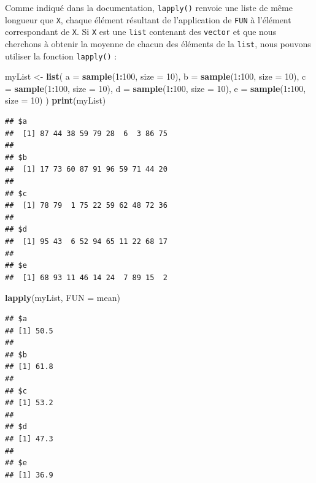 \documentclass[]{book}
\newenvironment{Shaded}{\begin{snugshade}}{\end{snugshade}}
\newcommand{\DataTypeTok}[1]{\textcolor[rgb]{0.13,0.29,0.53}{#1}}
\newcommand{\DecValTok}[1]{\textcolor[rgb]{0.00,0.00,0.81}{#1}}
\newcommand{\KeywordTok}[1]{\textcolor[rgb]{0.13,0.29,0.53}{\textbf{#1}}}
\newcommand{\NormalTok}[1]{#1}
\newcommand{\OperatorTok}[1]{\textcolor[rgb]{0.81,0.36,0.00}{\textbf{#1}}}
\newcommand{\StringTok}[1]{\textcolor[rgb]{0.31,0.60,0.02}{#1}}
\begin{document}
Comme indiqué dans la documentation, \texttt{lapply()} renvoie une liste de même longueur que \texttt{X}, chaque élément résultant de l'application de \texttt{FUN} à l'élément correspondant de \texttt{X}. Si \texttt{X} est une \texttt{list} contenant des \texttt{vector} et que nous cherchons à obtenir la moyenne de chacun des éléments de la \texttt{list}, nous pouvons utiliser la fonction \texttt{lapply()} :

\begin{Shaded}
\begin{Highlighting}[]
\NormalTok{myList <-}\StringTok{ }\KeywordTok{list}\NormalTok{(}
  \DataTypeTok{a =} \KeywordTok{sample}\NormalTok{(}\DecValTok{1}\OperatorTok{:}\DecValTok{100}\NormalTok{, }\DataTypeTok{size =} \DecValTok{10}\NormalTok{), }
  \DataTypeTok{b =} \KeywordTok{sample}\NormalTok{(}\DecValTok{1}\OperatorTok{:}\DecValTok{100}\NormalTok{, }\DataTypeTok{size =} \DecValTok{10}\NormalTok{), }
  \DataTypeTok{c =} \KeywordTok{sample}\NormalTok{(}\DecValTok{1}\OperatorTok{:}\DecValTok{100}\NormalTok{, }\DataTypeTok{size =} \DecValTok{10}\NormalTok{), }
  \DataTypeTok{d =} \KeywordTok{sample}\NormalTok{(}\DecValTok{1}\OperatorTok{:}\DecValTok{100}\NormalTok{, }\DataTypeTok{size =} \DecValTok{10}\NormalTok{), }
  \DataTypeTok{e =} \KeywordTok{sample}\NormalTok{(}\DecValTok{1}\OperatorTok{:}\DecValTok{100}\NormalTok{, }\DataTypeTok{size =} \DecValTok{10}\NormalTok{)}
\NormalTok{)}
\KeywordTok{print}\NormalTok{(myList)}
\end{Highlighting}
\end{Shaded}

\begin{verbatim}
## $a
##  [1] 87 44 38 59 79 28  6  3 86 75
## 
## $b
##  [1] 17 73 60 87 91 96 59 71 44 20
## 
## $c
##  [1] 78 79  1 75 22 59 62 48 72 36
## 
## $d
##  [1] 95 43  6 52 94 65 11 22 68 17
## 
## $e
##  [1] 68 93 11 46 14 24  7 89 15  2
\end{verbatim}

\begin{Shaded}
\begin{Highlighting}[]
\KeywordTok{lapply}\NormalTok{(myList, }\DataTypeTok{FUN =}\NormalTok{ mean)}
\end{Highlighting}
\end{Shaded}

\begin{verbatim}
## $a
## [1] 50.5
## 
## $b
## [1] 61.8
## 
## $c
## [1] 53.2
## 
## $d
## [1] 47.3
## 
## $e
## [1] 36.9
\end{verbatim}
\end{document}
